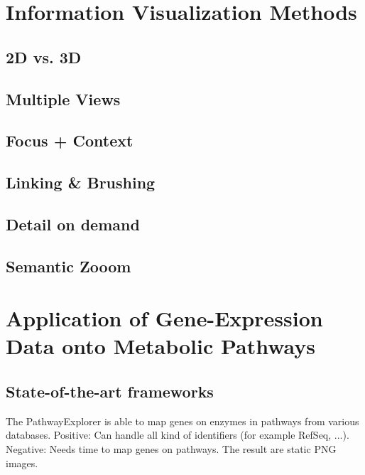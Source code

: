 
\section{Information Visualization Methods}

\cite{Bederson2003}
\cite{Spence2007}
\cite{Schumann2000}

\subsection{2D vs. 3D}

\subsection{Multiple Views}

\subsection{Focus + Context}

\subsection{Linking \& Brushing}

\subsection{Detail on demand}

\subsection{Semantic Zooom}

\section{Application of Gene-Expression Data onto Metabolic Pathways}

\subsection{State-of-the-art frameworks}


The PathwayExplorer is able to map genes on enzymes in pathways from various databases.
Positive: Can handle all kind of identifiers (for example RefSeq, ...).
Negative: Needs time to map genes on pathways. The result are static PNG images.


